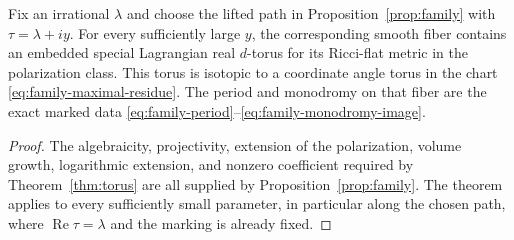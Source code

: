 \begin{corollary}
\label{cor:family-torus}
Fix an irrational $\lambda$ and choose the lifted path in
Proposition~\ref{prop:family} with $\tau=\lambda+iy$.
For every sufficiently large $y$, the corresponding smooth fiber
contains an embedded special Lagrangian real $d$-torus for its
Ricci-flat metric in the polarization class.  This torus is
isotopic to a coordinate angle torus in the chart
\eqref{eq:family-maximal-residue}.  The period and monodromy on
that fiber are the exact marked data
\eqref{eq:family-period}--\eqref{eq:family-monodromy-image}.
\end{corollary}

\begin{proof}
The algebraicity, projectivity, extension of the polarization,
volume growth, logarithmic extension, and nonzero coefficient
required by Theorem~\ref{thm:torus} are all supplied by
Proposition~\ref{prop:family}.  The theorem applies to every
sufficiently small parameter, in particular along the chosen path,
where $\operatorname{Re}\tau=\lambda$ and the marking is already fixed.
\end{proof}
